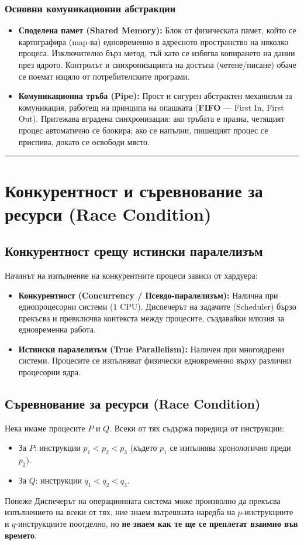 \documentclass{scrartcl}
\begin{document}
\begin{FlushLeft}
\subsubsection{Основни комуникационни абстракции}
\begin{itemize}
    \item \textbf{Споделена памет (Shared Memory):} Блок от физическата памет, който се картографира (map-ва) едновременно в адресното пространство на няколко процеса. Изключително бърз метод, тъй като се избягва копирането на данни през ядрото. Контролът и синхронизацията на достъпа (четене/писане) обаче се поемат изцяло от потребителските програми.
    \item \textbf{Комуникационна тръба (Pipe):} Прост и сигурен абстрактен механизъм за комуникация, работещ на принципа на опашката (\textbf{FIFO} --- First In, First Out). Притежава вградена синхронизация: ако тръбата е празна, четящият процес автоматично се блокира; ако се напълни, пишещият процес се приспива, докато се освободи място.
\end{itemize}

\noindent\rule{\linewidth}{0.4pt}

\section{Конкурентност и съревнование за ресурси (Race Condition)}

\subsection{Конкурентност срещу истински паралелизъм}
Начинът на изпълнение на конкурентните процеси зависи от хардуера:
\begin{itemize}
    \item \textbf{Конкурентност (Concurrency / Псевдо-паралелизъм):} Налична при еднопроцесорни системи ($1$ CPU). Диспечерът на задачите (Scheduler) бързо прекъсва и превключва контекста между процесите, създавайки илюзия за едновременна работа.
    \item \textbf{Истински паралелизъм (True Parallelism):} Наличен при многоядрени системи. Процесите се изпълняват физически едновременно върху различни процесорни ядра.
\end{itemize}

\subsection{Съревнование за ресурси (Race Condition)}
Нека имаме процесите $P$ и $Q$. Всеки от тях съдържа поредица от инструкции:
\begin{itemize}
    \item За $P$: инструкции $p_1 < p_2 < p_3$ (където $p_1$ се изпълнява хронологично преди $p_2$).
    \item За $Q$: инструкции $q_1 < q_2 < q_3$.
\end{itemize}
Понеже Диспечерът на операционната система може произволно да прекъсва изпълнението на всеки от тях, ние знаем вътрешната наредба на $p$-инструкциите и $q$-инструкциите поотделно, но \textbf{не знаем как те ще се преплетат взаимно във времето}.


\end{FlushLeft}
\end{document}
